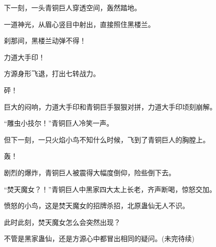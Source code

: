 \begin{this_body}
下一刻，一头青铜巨人穿透空间，轰然踏地。

一道神光，从眉心竖目中射出，直接照住黑楼兰。

刹那间，黑楼兰动弹不得！

力道大手印！

方源身形飞退，打出七转战力。

砰！

巨大的闷响，力道大手印和青铜巨手狠狠对拼，力道大手印顷刻崩解。

“雕虫小技尔！”青铜巨人冷笑一声。

但下一刻，一只火焰小鸟不知什么时候，飞到了青铜巨人的胸膛上。

轰！

剧烈的爆炸，青铜巨人被震得大幅度倒仰，险些倒下去。

“焚天魔女？！”青铜巨人中黑家四大太上长老，齐声断喝，惊怒交加。

愤怒的小鸟，这是焚天魔女的招牌杀招，北原蛊仙无人不识。

此时此刻，焚天魔女怎么会突然出现？

不管是黑家蛊仙，还是方源心中都冒出相同的疑问。(未完待续)

\end{this_body}

